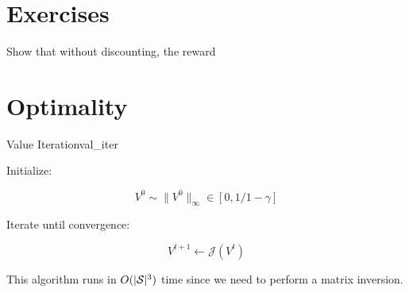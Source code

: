\documentclass[../main/main]{subfiles}
\begin{document}
\section{Exercises}

Show that without discounting, the reward






\section{Optimality}


\begin{theorem}{Value Iteration}{val_iter}

Initialize:

\[
    V^0 \sim \|V^0\|_\infty \in [0, 1/1-\gamma]
\]

Iterate until convergence:

\[
    V^{t+1} \gets \mathcal{J}(V^t)
\]


This algorithm runs in $O(|\S|^3)$ time since we need to perform a matrix
inversion.

\end{theorem}
\end{document}
